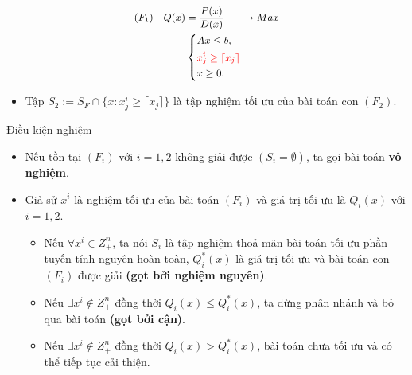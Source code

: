 \documentclass{beamer}
\begin{document}
\begin{frame}
\begin{equation} \small \label{F}
    \begin{split}
    (F_1) \quad Q(x) & = \frac{P(x)}{D(x)} \quad \longrightarrow Max \\
        & \left\{
        \begin{split}
        &Ax \leq  b, \\
        &\color{red} x^i_j \geq \lceil x_j \rceil \\
        &x \geq 0. \\
        \end{split}
        \right.    
    \end{split}
\end{equation}
\begin{itemize}
    \item Tập $S_2:=S_F \cap \{ x: x^i_j \geq \lceil x_j \rceil \}$ là tập nghiệm tối ưu của bài toán con $(F_2)$.
\end{itemize}               
\end{frame}
    

\begin{frame}{Điều kiện nghiệm}
    \begin{itemize}
    \item Nếu tồn tại $(F_i)$ với $i=1,2$ không giải được $(S_i = \emptyset )$, ta gọi bài toán \textbf{vô nghiệm}.
    \item Giả sử $x^i$ là nghiệm tối ưu của bài toán $(F_i)$ và giá trị tối ưu là $Q_i(x)$ với $i = 1,2$.
    \begin{itemize}
    \item Nếu $\forall x^i \in Z^n_+$, ta nói $S_i$ là tập nghiệm thoả mãn bài toán tối ưu phần tuyến tính nguyên hoàn toàn, $Q^*_i(x)$ là giá trị tối ưu và bài toán con $(F_i)$ được giải \textbf{(gọt bởi nghiệm nguyên)}.
    \item Nếu $\exists x^i \notin Z^n_+$ đồng thời $Q_i(x) \leq Q^*_i(x)$, ta dừng phân nhánh và bỏ qua bài toán \textbf{(gọt bởi cận)}.
    \item Nếu $\exists x^i \notin Z^n_+$ đồng thời $Q_i(x) > Q^*_i(x)$, bài toán chưa tối ưu và có thể tiếp tục cải thiện.
    \iffalse
    Với $x^i_{j^'}$ là nghiệm không nguyên và phân thành 2 bài toán con $P_3$ với tập nghiệm $S_l := S_i \cap \{ (x,y): x_{j^{'}} \leq \lfloor x_{j^{'}} \rfloor \}$, $P_l$ với $S_l := S_i \cap \{ (x,y): x_{j^{'}} \geq \lceil x_{j^{'}} \rceil \}$ trong đó $l=3,4$ và lặp lại quá trình.
    \fi
    \end{itemize}
    \end{itemize}
\end{frame}
\end{document}
